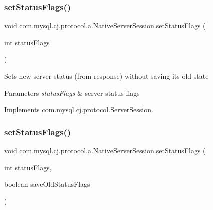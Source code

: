 \subsubsection{\texorpdfstring{set\+Status\+Flags()}{setStatusFlags()}\hspace{0.1cm}{\footnotesize\ttfamily [1/2]}}
{\footnotesize\ttfamily void com.\+mysql.\+cj.\+protocol.\+a.\+Native\+Server\+Session.\+set\+Status\+Flags (\begin{DoxyParamCaption}\item[{int}]{status\+Flags }\end{DoxyParamCaption})}

Sets new server status (from response) without saving it\textquotesingle{}s old state


\begin{DoxyParams}{Parameters}
{\em status\+Flags} & server status flags \\
\hline
\end{DoxyParams}


Implements \mbox{\hyperlink{interfacecom_1_1mysql_1_1cj_1_1protocol_1_1_server_session_a855cbd715a8c33299d062a72fd75d8f4}{com.\+mysql.\+cj.\+protocol.\+Server\+Session}}.

\mbox{\label{classcom_1_1mysql_1_1cj_1_1protocol_1_1a_1_1_native_server_session_a22280140ed155d3eedb9ab2c9c636afe}} 
\subsubsection{\texorpdfstring{set\+Status\+Flags()}{setStatusFlags()}\hspace{0.1cm}{\footnotesize\ttfamily [2/2]}}
{\footnotesize\ttfamily void com.\+mysql.\+cj.\+protocol.\+a.\+Native\+Server\+Session.\+set\+Status\+Flags (\begin{DoxyParamCaption}\item[{int}]{status\+Flags,  }\item[{boolean}]{save\+Old\+Status\+Flags }\end{DoxyParamCaption})}

